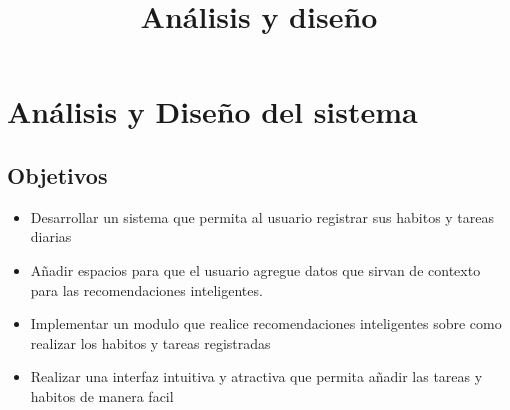 \documentclass{pretexto/report}
\title{Análisis y diseño}
\begin{document}

                                                     

\tableofcontents 
\pagebreak



\pagebreak
\section{Análisis y Diseño del sistema}

\subsection{Objetivos}

\begin{itemize}
    \item Desarrollar un sistema que permita al usuario registrar sus habitos y tareas diarias
    \item Añadir espacios para que el usuario agregue datos que sirvan de contexto para las recomendaciones inteligentes.
    \item Implementar un modulo que realice recomendaciones inteligentes sobre como realizar los habitos y tareas registradas
    \item Realizar una interfaz intuitiva y atractiva que permita añadir las tareas y habitos de manera facil
\end{itemize}
\end{document}
